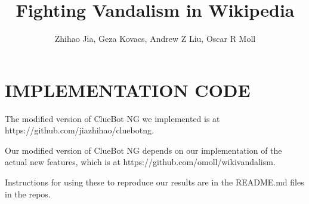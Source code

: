 \documentclass[12pt,a4paper]{article}
\begin{document}
\title{\textbf{Fighting Vandalism in Wikipedia}}
\author{
\large
Zhihao Jia,
Geza Kovacs,
Andrew Z Liu,
Oscar R Moll
\vspace{0.03in}\\
}
\date{}
\maketitle

\addtolength{\parskip}{8}









\section{IMPLEMENTATION CODE}

The modified version of ClueBot NG we implemented is at https://github.com/jiazhihao/cluebotng.

Our modified version of ClueBot NG depends on our implementation of the actual new features, which is at  https://github.com/omoll/wikivandalism.

Instructions for using these to reproduce our results are in the README.md files in the repos.



\end{document}
